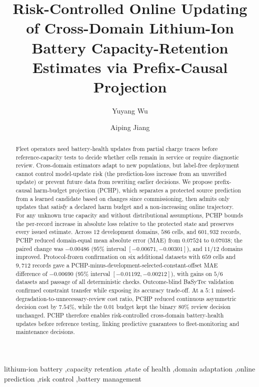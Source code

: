 \documentclass[preprint,12pt]{elsarticle}
\begin{document}
\begin{frontmatter}

\title{Risk-Controlled Online Updating of Cross-Domain Lithium-Ion Battery Capacity-Retention Estimates via Prefix-Causal Projection}

\author[shu]{Yuyang Wu}
\author[shu]{Aiping Jiang}
\address[shu]{SILC Business School, Shanghai University, 20 Chengzhong Road, Jiading District, Shanghai 201899, China}

\begin{abstract}
Fleet operators need battery-health updates from partial charge traces before reference-capacity tests to decide whether cells remain in service or require diagnostic review. Cross-domain estimators adapt to new populations, but label-free deployment cannot control model-update risk (the prediction-loss increase from an unverified update) or prevent future data from rewriting earlier decisions. We propose prefix-causal harm-budget projection (PCHP), which separates a protected source prediction from a learned candidate based on changes since commissioning, then admits only updates that satisfy a declared harm budget and a non-increasing online trajectory. For any unknown true capacity and without distributional assumptions, PCHP bounds the per-record increase in absolute loss relative to the protected state and preserves every issued estimate. Across $12$ development domains, $586$ cells, and $601{,}932$ records, PCHP reduced domain-equal mean absolute error (MAE) from $0.07524$ to $0.07038$; the paired change was $-0.00486$ ($95\%$ interval $[-0.00671,-0.00301]$), and $11/12$ domains improved. Protocol-frozen confirmation on six additional datasets with $659$ cells and $9{,}712$ records gave a PCHP-minus-development-selected-constant-offset MAE difference of $-0.00690$ ($95\%$ interval $[-0.01192,-0.00212]$), with gains on $5/6$ datasets and passage of all deterministic checks. Outcome-blind BaSyTec validation confirmed constraint transfer while exposing its accuracy trade-off. At a $5{:}1$ missed-degradation-to-unnecessary-review cost ratio, PCHP reduced continuous asymmetric decision cost by $7.54\%$, while the $0.01$ budget kept the binary $80\%$ review decision unchanged. PCHP therefore enables risk-controlled cross-domain battery-health updates before reference testing, linking predictive guarantees to fleet-monitoring and maintenance decisions.
\end{abstract}

\begin{keyword}
lithium-ion battery \sep capacity retention \sep state of health \sep domain adaptation \sep online prediction \sep risk control \sep battery management
\end{keyword}

\end{frontmatter}
\end{document}
